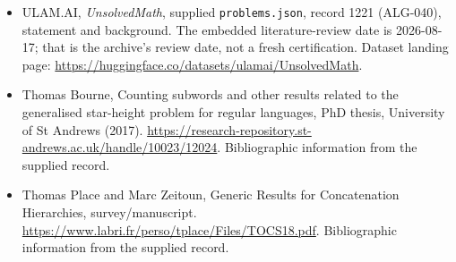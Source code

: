\documentclass[11pt,a4paper]{article}
\begin{document}
{\small

\begin{itemize}

\item[\hypertarget{source:1221:1}{S1}] ULAM.AI, \emph{UnsolvedMath}, supplied \texttt{problems.json}, record 1221 (ALG-040), statement and background. The embedded literature-review date is 2026-08-17; that is the archive’s review date, not a fresh certification. Dataset landing page: \url{https://huggingface.co/datasets/ulamai/UnsolvedMath}.

\item[\hypertarget{source:1221:2}{S2}] Thomas Bourne, Counting subwords and other results related to the generalised star-height problem for regular languages, PhD thesis, University of St Andrews (2017). \url{https://research-repository.st-andrews.ac.uk/handle/10023/12024}. Bibliographic information from the supplied record.

\item[\hypertarget{source:1221:3}{S3}] Thomas Place and Marc Zeitoun, Generic Results for Concatenation Hierarchies, survey/manuscript. \url{https://www.labri.fr/perso/tplace/Files/TOCS18.pdf}. Bibliographic information from the supplied record.

\end{itemize}

}

\label{end:1221}
\end{document}
